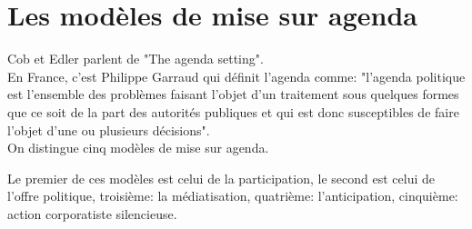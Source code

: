 \documentclass[10pt, a4paper, openany]{book}
\begin{document}
\section{Les modèles de mise sur agenda}

Cob et Edler parlent de "The agenda setting". \\
En France, c'est Philippe Garraud qui définit l'agenda comme: "l'agenda politique est l'ensemble des problèmes faisant l'objet d'un traitement sous quelques formes que ce soit de la part des autorités publiques et qui est donc susceptibles de faire l'objet d'une ou plusieurs décisions". \\
On distingue cinq modèles de mise sur agenda.


Le premier de ces modèles est celui de la participation, le second est celui de l'offre politique, troisième: la médiatisation, quatrième: l'anticipation, cinquième: action corporatiste silencieuse. 
\end{document}
